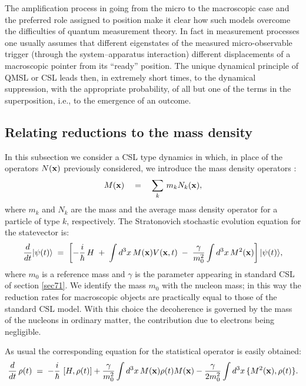 \documentclass[12pt]{article}
\begin{document}
The amplification process in going from the micro to the
macroscopic case and the preferred role assigned to position make
it clear how such models overcome the difficulties of quantum
measurement theory. In fact in measurement processes one usually
assumes that different eigenstates of the measured
micro-observable trigger (through the system--apparatus
interaction) different displacements of a macroscopic pointer from
its ``ready'' position. The unique dynamical principle of QMSL or
CSL leads then, in extremely short times, to the dynamical
suppression, with the appropriate probability, of all but one of
the terms in the superposition, i.e., to the emergence of an
outcome.


\subsection{Relating reductions to the mass density} \label{sec76}

In this subsection we consider a CSL type dynamics in which, in
place of the operators $N({\bf x})$ previously considered,  we
introduce the mass density operators \cite{cc}:
\begin{equation}
M({\bf x}) \quad = \quad \sum_{k}\, m_{k} N_{k}({\bf x}),
\end{equation}
where $m_{k}$  and $N_{k}$ are the mass and the average mass
density operator for a particle of type $k$, respectively. The
Stratonovich stochastic evolution equation for the statevector is:
\begin{equation}
\frac{d}{dt} |\psi(t)\rangle \; = \; \left[ - \frac{i}{\hbar}\, H
\; + \; \int d^{3} x\, M({\bf x}) V({\bf x}, t) \; - \;
\frac{\gamma}{m_{0}^{2}} \int d^{3} x\, M^{2}({\bf x}) \right]
|\psi(t)\rangle,
\end{equation}
where $m_{0}$ is a reference mass and $\gamma$ is the parameter
appearing in standard CSL of section \ref{sec71}. We identify the
mass $m_{0}$ with the nucleon mass; in this way the reduction
rates for macroscopic objects are practically equal to those of
the standard CSL model. With this choice the decoherence is
governed by the mass of the nucleons in ordinary matter, the
contribution due to electrons being negligible.

As usual the corresponding equation for the statistical operator
is easily obtained:
\begin{equation} \label{cslsob}
\frac{d}{dt}\, \rho(t) \; = \; - \frac{i}{\hbar}\, \left[ H,
\rho(t) \right]  +  \frac{\gamma}{m^{2}_{0}} \int d^3 x \, M({\bf
x}) \rho(t) M({\bf x})  - \frac{\gamma}{2m^{2}_{0}}  \int d^3 x \,
\{ M^{2}({\bf x}) , \rho(t) \}.
\end{equation}
\end{document}
